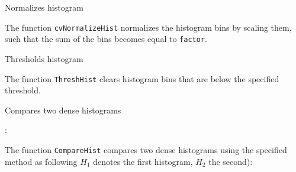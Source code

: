 \label{NormalizeHist}

Normalizes histogram


\begin{description}
\end{description}

The function \texttt{cvNormalizeHist} normalizes the histogram bins by scaling them, such that the sum of the bins becomes equal to \texttt{factor}.

\label{ThreshHist}

Thresholds histogram


\begin{description}
\end{description}

The function \texttt{ThreshHist} clears histogram bins that are below the specified threshold.

\label{CompareHist}

Compares two dense histograms


\begin{description}
:
\begin{description}
\end{description}
\end{description}

The function \texttt{CompareHist} compares two dense histograms using the specified method as following $H_1$ denotes the first histogram, $H_2$ the second):

